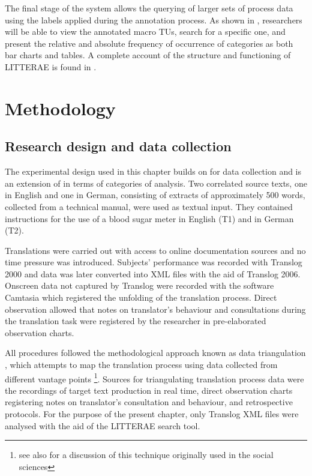 \documentclass[output=paper]{LSP/langsci}
\begin{document}
The final stage of the system allows the querying of larger sets of process data using the labels applied during the annotation process. As shown in , researchers will be able to view the annotated macro TUs, search for a specific one, and present the relative and absolute frequency of occurrence of categories as both bar charts and tables. A complete account of the structure and functioning of LITTERAE is found in \citet{AlvesVale2009}.

\section{Methodology}\label{sec:alves:3}
\subsection{Research design and data collection}\label{sec:alves:3.1}

The experimental design used in this chapter builds on \citet{AlvesLiparini2009} for data collection and is an extension of \citet{AlvesVale2009} in terms of categories of analysis.  Two correlated source texts, one in English and one in German, consisting of extracts of approximately 500 words, collected from a technical manual, were used as textual input.  They contained instructions for the use of a blood sugar meter in English (T1) and in German (T2). 

Translations were carried out with access to online documentation sources and no time pressure was introduced. Subjects' performance was recorded with Translog 2000 and data was later converted into XML files with the aid of Translog 2006. Onscreen data not captured by Translog were recorded with the software Camtasia which registered the unfolding of the translation process. Direct observation allowed that notes on translator's behaviour and consultations during the translation task were registered by the researcher in pre-elaborated observation charts.

All procedures followed the methodological approach known as data triangulation \citep{Alves2003}, which attempts to map the translation process using data collected from different vantage points \footnote{see also \cite{Jakobsen1999} for a discussion of this technique originally used in the social sciences}. Sources for triangulating translation process data were the recordings of target text production in real time, direct observation charts registering notes on translator's consultation and behaviour, and retrospective protocols. For the purpose of the present chapter, only Translog XML files were analysed with the aid of the LITTERAE search tool.
\end{document}
